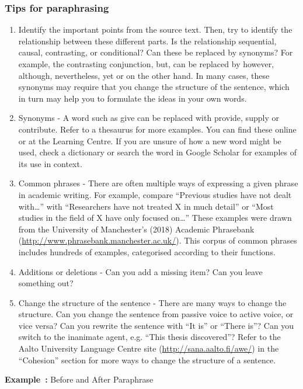 \documentclass[english, 12pt, a4paper, sci, utf8, a-2b, online]{aaltothesis}
\begin{document}
\subsubsection*{Tips for paraphrasing}

\begin{enumerate}
	\item Identify the important points from the source text. Then, try to 
	identify the relationship between these different parts. Is the relationship
	sequential, causal, contrasting, or conditional? Can these be replaced by 
	synonyms? For example, the contrasting conjunction, but, can be replaced by 
	however, although, nevertheless, yet or on the other hand. In many cases, 
	these synonyms may require that you change the structure of the sentence, 
	which in turn may help you to formulate the ideas in your own words.
	\item Synonyms - A word such as give can be replaced with provide, supply or
	contribute. Refer to a thesaurus for more examples. You can find these 
	online or at the Learning Centre. If you are unsure of how a new word might 
	be used, check a dictionary or search the word in Google Scholar for 
	examples of its use in context.
	\item Common phrases - There are often multiple ways of expressing a given 
	phrase in academic writing. For example, compare “Previous studies have not 
	dealt with\ldots” with “Researchers have not treated X in much detail” or 
	“Most studies in the field of X have only focused on\ldots” These examples 
	were drawn from the University of Manchester’s (2018) Academic Phrasebank  (\url{http://www.phrasebank.manchester.ac.uk/}). This corpus of common 
	phrases includes hundreds of examples, categorised according to their 
	functions.
	\item Additions or deletions - Can you add a missing item? Can you leave 
	something out?
	\item Change the structure of the sentence - There are many ways to change 
	the structure. Can you change the sentence from passive voice to active 
	voice, or vice versa? Can you rewrite the sentence with “It is” or “There 
	is”? Can you switch to the inanimate agent, e.g. “This thesis discovered”? 
	Refer to the Aalto University Language Centre site 
	(\url{http://sana.aalto.fi/awe/}) in the “Cohesion” section for more ways to
	change the structure of a sentence.
\end{enumerate}

\vspace{1em}
\noindent
{}
\textsf{\textbf{Example~\theexample:}} Before and After Paraphrase
\end{document}
